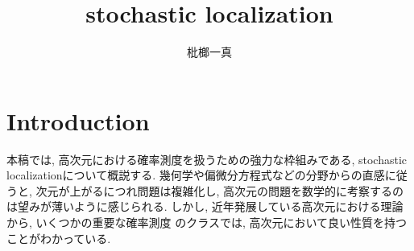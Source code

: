 \documentclass[11pt]{article}
\title{stochastic localization}
\author{枇榔一真}
\theoremstyle{breakstyle}
\begin{document}
\maketitle

\begin{abstract}
\end{abstract}
\section{Introduction}
本稿では, 高次元における確率測度を扱うための強力な枠組みである, stochastic localizationについて概説する.
幾何学や偏微分方程式などの分野からの直感に従うと, 次元が上がるにつれ問題は複雑化し, 
高次元の問題を数学的に考察するのは望みが薄いように感じられる.
しかし, 近年発展している高次元における理論から, いくつかの重要な確率測度
のクラスでは, 高次元において良い性質を持つことがわかっている\citep{artsteinavidan2015asymptotic,ledoux2001concentration,vershynin2018highdimensional}.
\end{document}
